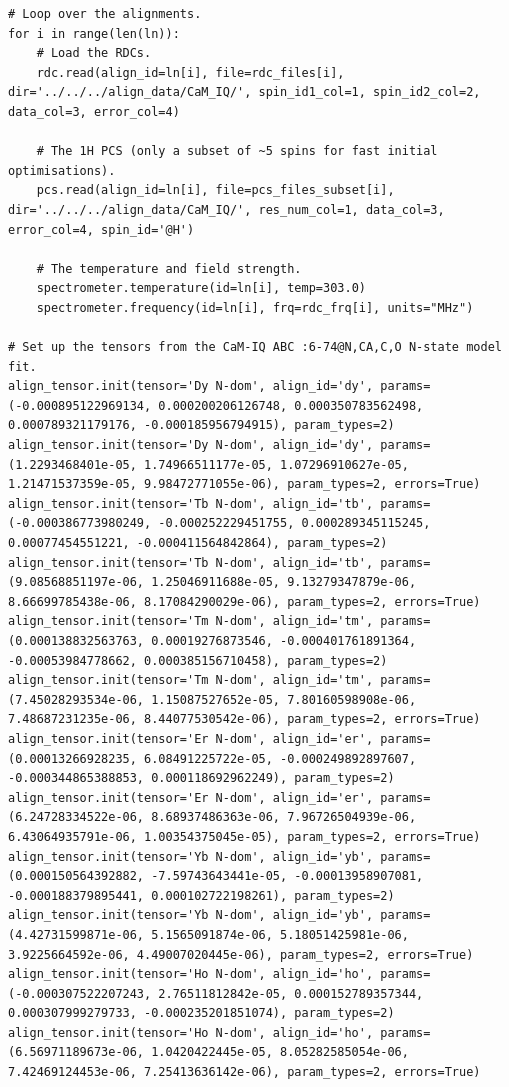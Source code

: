 \begin{lstlisting}
# Loop over the alignments.
for i in range(len(ln)):
    # Load the RDCs.
    rdc.read(align_id=ln[i], file=rdc_files[i], dir='../../../align_data/CaM_IQ/', spin_id1_col=1, spin_id2_col=2, data_col=3, error_col=4)

    # The 1H PCS (only a subset of ~5 spins for fast initial optimisations).
    pcs.read(align_id=ln[i], file=pcs_files_subset[i], dir='../../../align_data/CaM_IQ/', res_num_col=1, data_col=3, error_col=4, spin_id='@H')

    # The temperature and field strength.
    spectrometer.temperature(id=ln[i], temp=303.0)
    spectrometer.frequency(id=ln[i], frq=rdc_frq[i], units="MHz")

# Set up the tensors from the CaM-IQ ABC :6-74@N,CA,C,O N-state model fit.
align_tensor.init(tensor='Dy N-dom', align_id='dy', params=(-0.000895122969134, 0.000200206126748, 0.000350783562498, 0.000789321179176, -0.000185956794915), param_types=2)
align_tensor.init(tensor='Dy N-dom', align_id='dy', params=(1.2293468401e-05, 1.74966511177e-05, 1.07296910627e-05, 1.21471537359e-05, 9.98472771055e-06), param_types=2, errors=True)
align_tensor.init(tensor='Tb N-dom', align_id='tb', params=(-0.000386773980249, -0.000252229451755, 0.000289345115245, 0.00077454551221, -0.000411564842864), param_types=2)
align_tensor.init(tensor='Tb N-dom', align_id='tb', params=(9.08568851197e-06, 1.25046911688e-05, 9.13279347879e-06, 8.66699785438e-06, 8.17084290029e-06), param_types=2, errors=True)
align_tensor.init(tensor='Tm N-dom', align_id='tm', params=(0.000138832563763, 0.00019276873546, -0.000401761891364, -0.00053984778662, 0.000385156710458), param_types=2)
align_tensor.init(tensor='Tm N-dom', align_id='tm', params=(7.45028293534e-06, 1.15087527652e-05, 7.80160598908e-06, 7.48687231235e-06, 8.44077530542e-06), param_types=2, errors=True)
align_tensor.init(tensor='Er N-dom', align_id='er', params=(0.00013266928235, 6.08491225722e-05, -0.000249892897607, -0.000344865388853, 0.000118692962249), param_types=2)
align_tensor.init(tensor='Er N-dom', align_id='er', params=(6.24728334522e-06, 8.68937486363e-06, 7.96726504939e-06, 6.43064935791e-06, 1.00354375045e-05), param_types=2, errors=True)
align_tensor.init(tensor='Yb N-dom', align_id='yb', params=(0.000150564392882, -7.59743643441e-05, -0.00013958907081, -0.000188379895441, 0.000102722198261), param_types=2)
align_tensor.init(tensor='Yb N-dom', align_id='yb', params=(4.42731599871e-06, 5.1565091874e-06, 5.18051425981e-06, 3.9225664592e-06, 4.49007020445e-06), param_types=2, errors=True)
align_tensor.init(tensor='Ho N-dom', align_id='ho', params=(-0.000307522207243, 2.76511812842e-05, 0.000152789357344, 0.000307999279733, -0.000235201851074), param_types=2)
align_tensor.init(tensor='Ho N-dom', align_id='ho', params=(6.56971189673e-06, 1.0420422445e-05, 8.05282585054e-06, 7.42469124453e-06, 7.25413636142e-06), param_types=2, errors=True)


\end{lstlisting}
